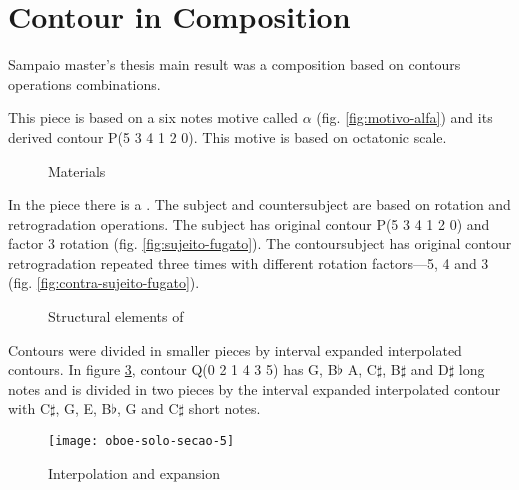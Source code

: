 \section{Contour in Composition}
\label{sec:contour-composition}

Sampaio master's thesis main result \cite{sampaio08:em} was a
composition based on contours operations combinations.

This piece is based on a six notes motive called $\alpha$
(fig. \ref{fig:motivo-alfa}) and its derived contour P(5 3 4 1 2
0). This motive is based on octatonic scale.

\begin{figure}[!p]
  \centering
  \subfloat[P(5 3 4 1 2 0) contour]{
    \texttt{[image: c-534120]}
    \label{fig:c-534120}
  }
  \caption{Materials}
  \label{fig:materials}
\end{figure}

In the piece there is a . The subject and countersubject
are based on rotation and retrogradation operations. The subject has
original contour P(5 3 4 1 2 0) and factor 3 rotation
(fig. \ref{fig:sujeito-fugato}). The contoursubject has original
contour retrogradation repeated three times with different rotation
factors---5, 4 and 3 (fig. \ref{fig:contra-sujeito-fugato}).

\begin{figure}
  \centering

  \caption{Structural elements of }
  \label{fig:elementos-fugato}
\end{figure}

Contours were divided in smaller pieces by interval expanded
interpolated contours. In figure \ref{fig:interpolacao-expansao},
contour Q(0 2 1 4 3 5) has G, B$\flat$ A, C$\sharp$, B$\sharp$ and
D$\sharp$ long notes and is divided in two pieces by the interval
expanded interpolated contour with C$\sharp$, G, E, B$\flat$, G and
C$\sharp$ short notes.

\begin{figure}[!p]
  \centering
  \texttt{[image: oboe-solo-secao-5]}
  \caption{Interpolation and expansion}
  \label{fig:interpolacao-expansao}
\end{figure}


